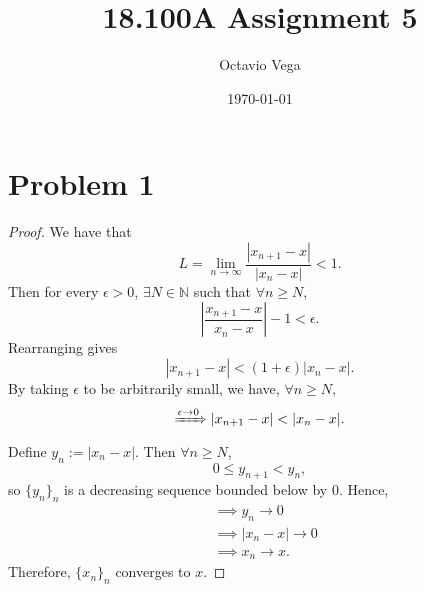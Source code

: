 \documentclass{article}
\title{18.100A Assignment 5}
\author{Octavio Vega}
\date\today
\begin{document}
\maketitle

\section*{Problem 1}
\begin{proof}
	We have that
	\begin{equation}
		L = \lim\limits_{n\to\infty} \frac{|x_{n+1}-x|}{|x_n-x|} < 1.
	\end{equation}
	Then for every $\epsilon > 0$, $\exists N \in \mathbb{N}$ such that $\forall n \geq N$, 
	\begin{equation}
		\left|\frac{x_{n+1}-x}{x_n - x}\right| - 1 < \epsilon.
	\end{equation}
	Rearranging gives
	\begin{equation}
		|x_{n+1}-x| < (1+\epsilon)|x_n - x|.
	\end{equation}
	By taking $\epsilon$ to be arbitrarily small, we have, $\forall n \geq N$,
	\begin{equation}
		\xRightarrow{\epsilon \to 0} |x_{n+1}-x| < |x_n-x|.
	\end{equation}
	Define $y_n := |x_n - x|$. Then $\forall n \geq N$, 
	\begin{equation}
		0 \leq y_{n+1} < y_n,
	\end{equation}
	so $\{y_n\}_n$ is a decreasing sequence bounded below by $0$. Hence,
	\begin{align}
		&\implies y_n \rightarrow 0 \\
		&\implies |x_n - x| \rightarrow 0 \\
		&\implies x_n \rightarrow x.
	\end{align}
	Therefore, $\{x_n\}_n$ converges to $x$.
\end{proof}
	
\end{document}
